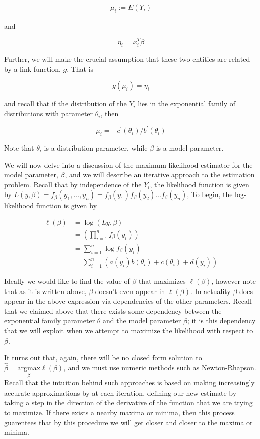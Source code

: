\begin{align*} 
\mu_i := E(Y_i)  
\end{align*}

and

$$\eta_i = x_i^T \beta$$

Further, we will make the crucial assumption that these two entities are related by a link function, $g$. That is

$$g(\mu_i) = \eta_i$$

and recall that if the distribution of the $Y_i$ lies in the exponential family of distributions with parameter $\theta_i$, then

$$\mu_i = -c^\prime(\theta_i)/b^\prime(\theta_i)$$

Note that $\theta_i$ is a distribution parameter, while $\beta$ is a model parameter.

We will now delve into a discussion of the maximum likelihood estimator for the model parameter, $\beta$, and we will describe an iterative approach to the estimation problem. Recall that by independence of the $Y_i$, the likelihood function is given by $L(y, \beta) = f_{\beta}(y_1, ..., y_n) = f_{\beta}(y_1)f_{\beta}(y_2) \dots f_{\beta}(y_n)$, To begin, the log-likelihood function is given by

\begin{align*}
\ell(\beta) & = \log (Ly, \beta) \\
& = \left( \prod_{i=1}^n f_{\beta}(y_i) \right) \\
& = \sum_{i=1}^n \log f_\beta(y_i) \\
& = \sum_{i=1}^n \left( a(y_i) b(\theta_i) + c(\theta_i) + d(y_i) \right)
\end{align*}

Ideally we would like to find the value of $\beta$ that maximizes $\ell(\beta)$, however note that as it is written above, $\beta$ doesn't even appear in $\ell(\beta)$. In actuality $\beta$ does appear in the above expression via dependencies of the other parameters. Recall that we claimed above that there exists some dependency between the exponential family parameter $\theta$ and the model parameter $\beta$; it is this dependency that we will exploit when we attempt to maximize the likelihood with respect to $\beta$.

It turns out that, again, there will be no closed form solution to $\hat{\beta} = \underset{\beta}{\text{argmax}} \ell(\beta)$, and we must use numeric methods such as Newton-Rhapson. Recall that the intuition behind such approaches is based on making increasingly accurate approximations by at each iteration, defining our new estimate by taking a step in the direction of the derivative of the function that we are trying to maximize. If there exists a nearby maxima or minima, then this process guarentees that by this procedure we will get closer and closer to the maxima or minima.

